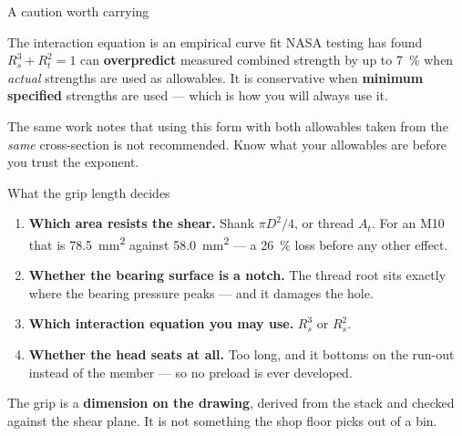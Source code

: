 \documentclass[aspectratio=169,10pt]{beamer}
\begin{document}
\begin{frame}{A caution worth carrying}
\begin{alertblock}{The interaction equation is an empirical curve fit}
NASA testing has found $R_s^3+R_t^2=1$ can \textbf{overpredict} measured combined strength by up to
\SI{7}{\percent} when \emph{actual} strengths are used as allowables.
\vspace{3pt}
It is conservative when \textbf{minimum specified} strengths are used --- which is how you will
always use it.
\end{alertblock}
\vfill
The same work notes that using this form with both allowables taken from the \emph{same}
cross-section is not recommended.
\vfill
\centering
\alert{Know what your allowables are before you trust the exponent.}
\end{frame}

\begin{frame}{What the grip length decides}
\begin{enumerate}
\item \textbf{Which area resists the shear.} Shank $\pi D^2/4$, or thread $A_t$. For an M10 that is
  \SI{78.5}{mm^2} against \SI{58.0}{mm^2} --- a \SI{26}{\percent} loss before any other effect.
\item \textbf{Whether the bearing surface is a notch.} The thread root sits exactly where the
  bearing pressure peaks --- and it damages the hole.
\item \textbf{Which interaction equation you may use.} $R_s^3$ or $R_s^2$.
\item \textbf{Whether the head seats at all.} Too long, and it bottoms on the run-out instead of the
  member --- so no preload is ever developed.
\end{enumerate}
\vfill
\begin{alertblock}{}
\centering
The grip is a \textbf{dimension on the drawing}, derived from the stack and checked against the
shear plane. It is not something the shop floor picks out of a bin.
\end{alertblock}
\end{frame}
\end{document}
